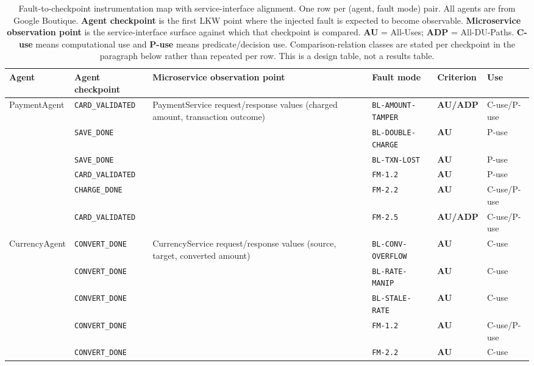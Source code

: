 \documentclass[sigconf,review,anonymous,balance=false]{acmart}
\begin{document}
\begin{table}[t]
\centering
\caption{Fault-to-checkpoint instrumentation map with service-interface
alignment. One row per (agent, fault mode) pair. All agents are from Google
Boutique.
\textbf{Agent checkpoint} is the first LKW point where the injected fault is
expected to become observable. \textbf{Microservice observation point} is the
service-interface surface against which that checkpoint is compared.
\textbf{AU} = All-Uses; \textbf{ADP} = All-DU-Paths. \textbf{C-use} means
computational use and \textbf{P-use} means predicate/decision use.
Comparison-relation classes are stated per checkpoint in the paragraph below
rather than repeated per row. This is a design table, not a results table.}
\label{tab:checkpoint-fault-merged}
\footnotesize
\setlength{\tabcolsep}{4pt}
\begin{tabular}{@{}p{2.45cm}p{2.55cm}p{4.35cm}p{2.75cm}ll@{}}
\toprule
\textbf{Agent} & \textbf{Agent checkpoint} & \textbf{Microservice observation point} & \textbf{Fault mode} & \textbf{Criterion} & \textbf{Use} \\
\midrule
PaymentAgent & \texttt{CARD\_VALIDATED} & PaymentService request/response values (charged amount, transaction outcome) & \texttt{BL-AMOUNT-TAMPER} & \textbf{AU/ADP} & C-use/P-use \\
 & \texttt{SAVE\_DONE} & & \texttt{BL-DOUBLE-CHARGE} & \textbf{AU} & P-use \\
 & \texttt{SAVE\_DONE} & & \texttt{BL-TXN-LOST} & \textbf{AU} & P-use \\
 & \texttt{CARD\_VALIDATED} & & \texttt{FM-1.2} & \textbf{AU} & P-use \\
 & \texttt{CHARGE\_DONE} & & \texttt{FM-2.2} & \textbf{AU} & C-use/P-use \\
 & \texttt{CARD\_VALIDATED} & & \texttt{FM-2.5} & \textbf{AU/ADP} & C-use/P-use \\
\midrule
CurrencyAgent & \texttt{CONVERT\_DONE} & CurrencyService request/response values (source, target, converted amount) & \texttt{BL-CONV-OVERFLOW} & \textbf{AU} & C-use \\
 & \texttt{CONVERT\_DONE} & & \texttt{BL-RATE-MANIP} & \textbf{AU} & C-use \\
 & \texttt{CONVERT\_DONE} & & \texttt{BL-STALE-RATE} & \textbf{AU} & C-use \\
 & \texttt{CONVERT\_DONE} & & \texttt{FM-1.2} & \textbf{AU} & C-use/P-use \\
 & \texttt{CONVERT\_DONE} & & \texttt{FM-2.2} & \textbf{AU} & C-use \\

\end{tabular}
\end{table}
\end{document}
